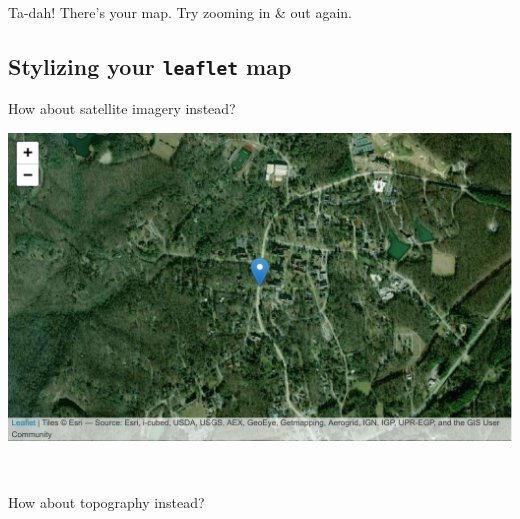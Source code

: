 \documentclass[]{book}
\newenvironment{Shaded}{\begin{snugshade}}{\end{snugshade}}
\newcommand{\DataTypeTok}[1]{\textcolor[rgb]{0.13,0.29,0.53}{#1}}
\newcommand{\KeywordTok}[1]{\textcolor[rgb]{0.13,0.29,0.53}{\textbf{#1}}}
\newcommand{\NormalTok}[1]{#1}
\newcommand{\OperatorTok}[1]{\textcolor[rgb]{0.81,0.36,0.00}{\textbf{#1}}}
\newcommand{\StringTok}[1]{\textcolor[rgb]{0.31,0.60,0.02}{#1}}
\begin{document}
~

Ta-dah! There's your map. Try zooming in \& out again.

\hypertarget{stylizing-your-leaflet-map}{%
\subsection*{\texorpdfstring{Stylizing your \texttt{leaflet} map}{Stylizing your leaflet map}}\label{stylizing-your-leaflet-map}}

How about satellite imagery instead?

\begin{Shaded}
\end{Shaded}

\includegraphics{figures/unnamed-chunk-389-1.pdf}

~

How about topography instead?

\begin{Shaded}
\end{Shaded}
\end{document}
